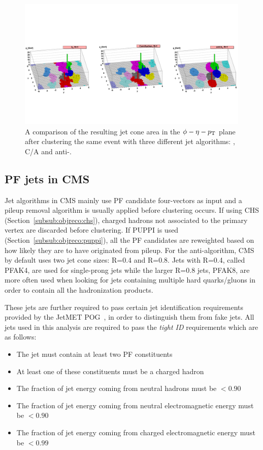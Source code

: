 \begin{figure}[h] 
    \centering
    \includegraphics[width=0.99\textwidth]{figures/event_reconstruction/clustering_algos.pdf}
    \caption{A comparison of the resulting jet cone area in the $\phi-\eta-p_{\mathrm{T}}$ plane after clustering the same event with three different jet algorithms: \kt, C/A and anti-\kt. ~\cite{Cacciari:2008gp}}
    \label{fig:objreco:jetalgo_comp}
\end{figure}

\subsection{PF jets in CMS}
Jet algorithms in CMS mainly use PF candidate four-vectors as input and a pileup removal algorithm is usually applied before clustering occurs. If using CHS (Section~\ref{subsub:objreco:chs}), charged hadrons not associated to the primary vertex are discarded before clustering. If PUPPI is used (Section~\ref{subsub:objreco:puppi}), all the PF candidates are reweighted based on how likely they are to have originated from pileup. 
For the anti-\kt algorithm, CMS by default uses two jet cone sizes: R=0.4 and R=0.8. Jets with R=0.4, called PFAK4, are used for single-prong jets while the larger R=0.8 jets, PFAK8, are more often used when looking for jets containing multiple hard quarks/gluons in order to contain all the hadronization products.\par
 These jets are further required to pass certain jet identification requirements provided by the JetMET POG~\cite{jetID_JME}, in order to distinguish them from fake jets. All jets used in this analysis are required to pass the \textit{tight ID} requirements which are as follows:
 
\begin{itemize}
\item The jet must contain at least two PF constituents
\item At least one of these constituents must be a charged hadron
\item The fraction of jet energy coming from neutral hadrons must be $< 0.90$
\item The fraction of jet energy coming from neutral electromagnetic energy must be $< 0.90$
\item The fraction of jet energy coming from charged electromagnetic energy must be $< 0.99$
\end{itemize} 

